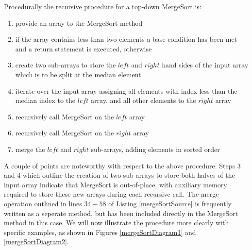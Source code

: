 \documentclass[12pt,a4paper]{article}
\begin{document}
Procedurally the recursive procedure for a top-down MergeSort is:

\begin{enumerate}
\item provide an array to the MergeSort method
\item if the array contains less than two elements a base condition has been met and a return statement is executed, otherwise
\item create two sub-arrays to store the $left$ and $right$ hand sides of the input array which is to be split at the median element
\item iterate over the input array assigning all elements with index less than the median index to the $left$ array, and all other elements to the $right$ array
\item recursively call MergeSort on the $left$ array
\item recursively call MergeSort on the $right$ array
\item merge the $left$ and $right$ sub-arrays, adding elements in sorted order
\end{enumerate}

A couple of points are noteworthy with respect to the above procedure. Steps 3 and 4 which outline the creation of two sub-arrays to store both halves of the input array indicate that MergeSort is out-of-place, with auxiliary memory required to store these new arrays during each recursive call. The merge operation outlined in lines $34-58$ of Listing \ref{mergeSortSource} is frequently written as a seperate method, but has been included directly in the MergeSort method in this case. We will now illustrate the procedure more clearly with specific examples, as shown in Figures \ref{mergeSortDiagram1} and \ref{mergeSortDiagram2}.
\end{document}
